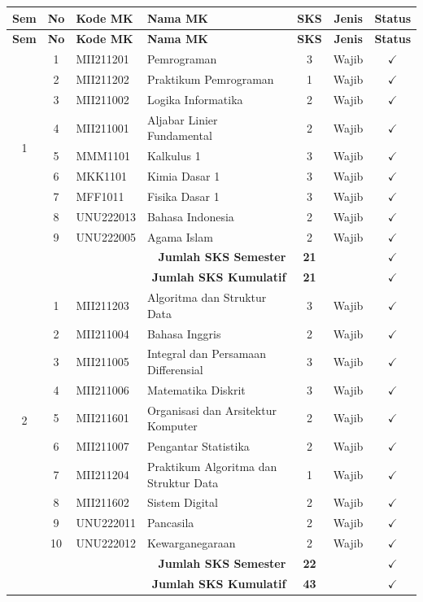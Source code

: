 \documentclass[a4paper,12pt]{article}
\begin{document}
\begin{longtable}{|c|c|l|p{6.5cm}|c|c|c|}
    \hline
    \textbf{Sem} & \textbf{No} & \textbf{Kode MK} & \textbf{Nama MK} & \textbf{SKS} & \textbf{Jenis} & \textbf{Status} \\
    \hline
    \endfirsthead
    \hline
    \textbf{Sem} & \textbf{No} & \textbf{Kode MK} & \textbf{Nama MK} & \textbf{SKS} & \textbf{Jenis} & \textbf{Status} \\
    \hline
    \endhead
    
    \multirow{9}{*}{1} 
    & 1 & MII211201 & Pemrograman & 3 & Wajib & $\checkmark$ \\
    & 2 & MII211202 & Praktikum Pemrograman & 1 & Wajib & $\checkmark$ \\
    & 3 & MII211002 & Logika Informatika & 2 & Wajib & $\checkmark$ \\
    & 4 & MII211001 & Aljabar Linier Fundamental & 2 & Wajib & $\checkmark$ \\
    & 5 & MMM1101 & Kalkulus 1 & 3 & Wajib & $\checkmark$ \\
    & 6 & MKK1101 & Kimia Dasar 1 & 3 & Wajib & $\checkmark$ \\
    & 7 & MFF1011 & Fisika Dasar 1 & 3 & Wajib & $\checkmark$ \\
    & 8 & UNU222013 & Bahasa Indonesia & 2 & Wajib & $\checkmark$ \\
    & 9 & UNU222005 & Agama Islam & 2 & Wajib & $\checkmark$ \\
    \hline
    \multicolumn{4}{|r|}{\textbf{Jumlah SKS Semester}} & \textbf{21} & & $\checkmark$ \\
    \multicolumn{4}{|r|}{\textbf{Jumlah SKS Kumulatif}} & \textbf{21} & & $\checkmark$ \\
    \hline
    
    \multirow{10}{*}{2} 
    & 1 & MII211203 & Algoritma dan Struktur Data & 3 & Wajib & $\checkmark$ \\
    & 2 & MII211004 & Bahasa Inggris & 2 & Wajib & $\checkmark$ \\
    & 3 & MII211005 & Integral dan Persamaan Differensial & 3 & Wajib & $\checkmark$ \\
    & 4 & MII211006 & Matematika Diskrit & 3 & Wajib & $\checkmark$ \\
    & 5 & MII211601 & Organisasi dan Arsitektur Komputer & 2 & Wajib & $\checkmark$ \\
    & 6 & MII211007 & Pengantar Statistika & 2 & Wajib & $\checkmark$ \\
    & 7 & MII211204 & Praktikum Algoritma dan Struktur Data & 1 & Wajib & $\checkmark$ \\
    & 8 & MII211602 & Sistem Digital & 2 & Wajib & $\checkmark$ \\
    & 9 & UNU222011 & Pancasila & 2 & Wajib & $\checkmark$ \\
    & 10 & UNU222012 & Kewarganegaraan & 2 & Wajib & $\checkmark$ \\
    \hline
    \multicolumn{4}{|r|}{\textbf{Jumlah SKS Semester}} & \textbf{22} & & $\checkmark$ \\
    \multicolumn{4}{|r|}{\textbf{Jumlah SKS Kumulatif}} & \textbf{43} & & $\checkmark$ \\
    \hline


\end{longtable}
\end{document}
